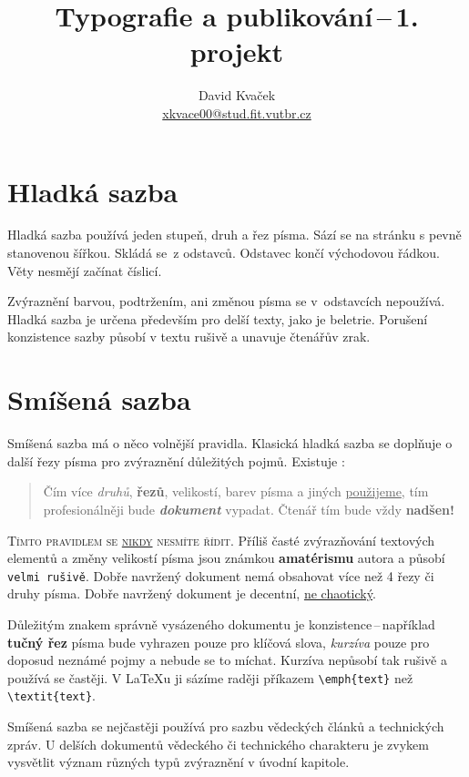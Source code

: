 \documentclass[twocolumn, a4paper, 10pt]{article}
\title{Typografie a publikování\,--\,1. projekt}
\author{David Kvaček \\ \href{mailto:xkvace00@stud.fit.vutbr.cz}{xkvace00@stud.fit.vutbr.cz}}
\date{}
\begin{document}
\maketitle

\section{Hladká sazba}
Hladká sazba používá jeden stupeň, druh a řez písma. Sází se na stránku s pevně stanovenou šířkou. Skládá se~z odstavců. Odstavec končí východovou řádkou. Věty nesmějí začínat číslicí.

Zvýraznění barvou, podtržením, ani změnou písma se v~odstavcích nepoužívá. Hladká sazba je určena především pro delší texty, jako je beletrie. Porušení konzistence sazby působí v textu rušivě a unavuje čtenářův zrak.

\section{Smíšená sazba}
\label{second}
Smíšená sazba má o něco volnější pravidla. Klasická hladká sazba se doplňuje o další řezy písma pro zvýraznění důležitých pojmů. Existuje :

\begin{quote}
    \quad Čím více \emph{druhů}, \textbf{řezů}, {\huge{velikostí}}, {\color{blue} barev} písma a jiných \textsc{\color{red}{efektů}} \underline{použijeme}, tím {\color{orange} profesionálněji} bude \textbf{\emph{\large{\textrm{dokument}}}} vypadat. {\tiny{Čtenář}} tím bude vždy \textbf{\huge{nadšen!}}
\end{quote}

\textsc{Tímto pravidlem se \underline{nikdy} nesmíte řídit.} Příliš časté zvýrazňování textových elementů a změny {\tiny{velikostí}} písma jsou známkou \textbf{amatérismu} autora a působí \texttt{velmi rušivě}. Dobře navržený dokument nemá obsahovat více než 4 řezy či druhy písma. Dobře navržený dokument je decentní, \underline{ne chaotický}.

Důležitým znakem správně vysázeného dokumentu je konzistence\,--\,například \textbf{tučný řez} písma bude vyhrazen pouze pro klíčová slova, \emph{kurzíva} pouze pro doposud neznámé pojmy a nebude se to míchat. Kurzíva nepůsobí tak rušivě a používá se častěji. V \LaTeX u ji sázíme raději příkazem \texttt{\textbackslash emph\{text\}} než \texttt{\textbackslash textit\{text\}}.

Smíšená sazba se nejčastěji používá pro sazbu vědeckých článků a technických zpráv. U delších dokumentů vědeckého či technického charakteru je zvykem vysvětlit význam různých typů zvýraznění v úvodní kapitole.
\end{document}
